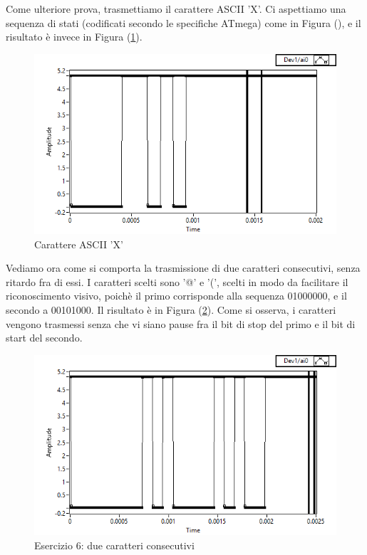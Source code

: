 \documentclass[journal, a4paper]{IEEEtran}
\begin{document}
Come ulteriore prova, trasmettiamo il carattere ASCII 'X'. Ci aspettiamo una sequenza di stati (codificati secondo le specifiche ATmega) come in Figura (), e il risultato è invece in Figura (\ref{fig:es5_X}).\\

\begin{figure}
\centering
\includegraphics[width=0.9\linewidth]{./es5_X}
\caption{Carattere ASCII 'X'}
\label{fig:es5_X}
\end{figure}

Vediamo ora come si comporta la trasmissione di due caratteri consecutivi, senza ritardo fra di essi. I caratteri scelti sono '@' e '(', scelti in modo da facilitare il riconoscimento visivo, poichè il primo corrisponde alla sequenza 01000000, e il secondo a 00101000. Il risultato è in Figura (\ref{fig:es6_consecutive}). Come si osserva, i caratteri vengono trasmessi senza che vi siano pause fra il bit di stop del primo e il bit di start del secondo. 

\begin{figure}
\centering
\includegraphics[width=0.9\linewidth]{./es6_consecutive}
\caption{Esercizio 6: due caratteri consecutivi}
\label{fig:es6_consecutive}
\end{figure}
\end{document}
